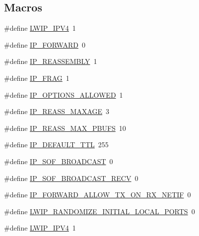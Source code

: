 \subsection*{Macros}
\begin{DoxyCompactItemize}
\item 
\#define \hyperlink{group__lwip__opts__ipv4_ga429e811a80ebb5157e14a854870c4410}{L\+W\+I\+P\+\_\+\+I\+P\+V4}~1
\item 
\#define \hyperlink{group__lwip__opts__ipv4_ga881d32ff5ee02af01f758953f1b51d59}{I\+P\+\_\+\+F\+O\+R\+W\+A\+RD}~0
\item 
\#define \hyperlink{group__lwip__opts__ipv4_ga1a31ab0e0f37b17d40fa7c35bc2c4f69}{I\+P\+\_\+\+R\+E\+A\+S\+S\+E\+M\+B\+LY}~1
\item 
\#define \hyperlink{group__lwip__opts__ipv4_gaf85c8bdd5035b6cada790b4cc2a209a4}{I\+P\+\_\+\+F\+R\+AG}~1
\item 
\#define \hyperlink{group__lwip__opts__ipv4_gaa956b0167c37a2265b55e2d0204a3933}{I\+P\+\_\+\+O\+P\+T\+I\+O\+N\+S\+\_\+\+A\+L\+L\+O\+W\+ED}~1
\item 
\#define \hyperlink{group__lwip__opts__ipv4_gad41122bd0b5485a18a4415c8f953727b}{I\+P\+\_\+\+R\+E\+A\+S\+S\+\_\+\+M\+A\+X\+A\+GE}~3
\item 
\#define \hyperlink{group__lwip__opts__ipv4_ga29084a46d7d4be30e8029d356bca0394}{I\+P\+\_\+\+R\+E\+A\+S\+S\+\_\+\+M\+A\+X\+\_\+\+P\+B\+U\+FS}~10
\item 
\#define \hyperlink{group__lwip__opts__ipv4_ga556b9b58fd02c0fdd126791baef77411}{I\+P\+\_\+\+D\+E\+F\+A\+U\+L\+T\+\_\+\+T\+TL}~255
\item 
\#define \hyperlink{group__lwip__opts__ipv4_ga0b2c993fd940f5774108298933310384}{I\+P\+\_\+\+S\+O\+F\+\_\+\+B\+R\+O\+A\+D\+C\+A\+ST}~0
\item 
\#define \hyperlink{group__lwip__opts__ipv4_ga0f1fbf42d3344bf87cd056d48ddca3db}{I\+P\+\_\+\+S\+O\+F\+\_\+\+B\+R\+O\+A\+D\+C\+A\+S\+T\+\_\+\+R\+E\+CV}~0
\item 
\#define \hyperlink{group__lwip__opts__ipv4_ga9e761df07c4e93901858741d4771dbc7}{I\+P\+\_\+\+F\+O\+R\+W\+A\+R\+D\+\_\+\+A\+L\+L\+O\+W\+\_\+\+T\+X\+\_\+\+O\+N\+\_\+\+R\+X\+\_\+\+N\+E\+T\+IF}~0
\item 
\#define \hyperlink{group__lwip__opts__ipv4_gafd988b31749b30c65009c8ddf6c0a58d}{L\+W\+I\+P\+\_\+\+R\+A\+N\+D\+O\+M\+I\+Z\+E\+\_\+\+I\+N\+I\+T\+I\+A\+L\+\_\+\+L\+O\+C\+A\+L\+\_\+\+P\+O\+R\+TS}~0
\item 
\#define \hyperlink{group__lwip__opts__ipv4_ga429e811a80ebb5157e14a854870c4410}{L\+W\+I\+P\+\_\+\+I\+P\+V4}~1

\end{DoxyCompactItemize}
